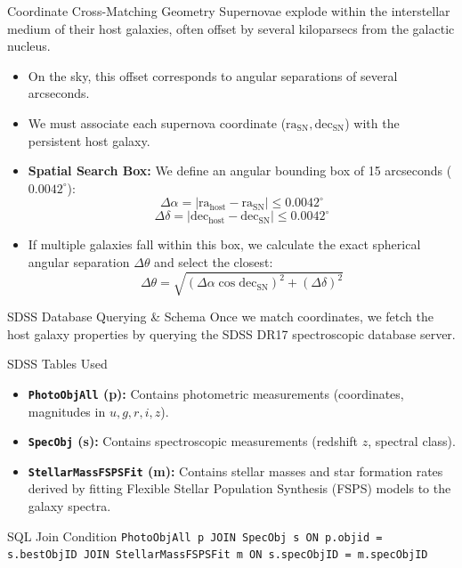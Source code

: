 \documentclass[9pt]{beamer}
\begin{document}
\begin{frame}{Coordinate Cross-Matching Geometry}
  Supernovae explode within the interstellar medium of their host galaxies, often offset by several kiloparsecs from the galactic nucleus.
  \begin{itemize}
    \item On the sky, this offset corresponds to angular separations of several arcseconds.
    \item We must associate each supernova coordinate ($\text{ra}_{\text{SN}}, \text{dec}_{\text{SN}}$) with the persistent host galaxy.
    \item \textbf{Spatial Search Box:}
      We define an angular bounding box of 15 arcseconds ($0.0042^\circ$):
      $$\Delta \alpha = |\text{ra}_{\text{host}} - \text{ra}_{\text{SN}}| \le 0.0042^\circ$$
      $$\Delta \delta = |\text{dec}_{\text{host}} - \text{dec}_{\text{SN}}| \le 0.0042^\circ$$
    \item If multiple galaxies fall within this box, we calculate the exact spherical angular separation $\Delta \theta$ and select the closest:
      $$\Delta \theta = \sqrt{(\Delta \alpha \cos \text{dec}_{\text{SN}})^2 + (\Delta \delta)^2}$$
  \end{itemize}
\end{frame}

\begin{frame}{SDSS Database Querying \& Schema}
  Once we match coordinates, we fetch the host galaxy properties by querying the SDSS DR17 spectroscopic database server.
  \begin{block}{SDSS Tables Used}
    \begin{itemize}
      \item \textbf{\texttt{PhotoObjAll} (p):} Contains photometric measurements (coordinates, magnitudes in $u,g,r,i,z$).
      \item \textbf{\texttt{SpecObj} (s):} Contains spectroscopic measurements (redshift $z$, spectral class).
      \item \textbf{\texttt{StellarMassFSPSFit} (m):} Contains stellar masses and star formation rates derived by fitting Flexible Stellar Population Synthesis (FSPS) models to the galaxy spectra.
    \end{itemize}
  \end{block}
  \begin{block}{SQL Join Condition}
    \texttt{PhotoObjAll p JOIN SpecObj s ON p.objid = s.bestObjID JOIN StellarMassFSPSFit m ON s.specObjID = m.specObjID}
  \end{block}
\end{frame}
\end{document}
